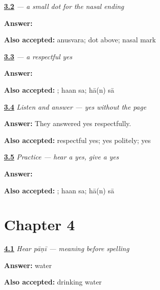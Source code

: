 \noindent\begin{minipage}[t]{\linewidth}
\raggedright
\hyperlink{review-MW-W03-anusvara-add}{\textbf{3.2}} \emph{ — a small dot for the nasal ending}\par
\small \textbf{Answer:} \par
\footnotesize \textbf{Also accepted:} anusvara; dot above; nasal mark
\end{minipage}\par\medskip

\noindent\begin{minipage}[t]{\linewidth}
\raggedright
\hyperlink{review-MW-C03-haan-saa-build}{\textbf{3.3}} \emph{  — a respectful yes}\par
\small \textbf{Answer:}  \par
\footnotesize \textbf{Also accepted:}  ; haan sa; hā(n) sā
\end{minipage}\par\medskip

\noindent\begin{minipage}[t]{\linewidth}
\raggedright
\hyperlink{review-MW-C03-listen-say-choice}{\textbf{3.4}} \emph{Listen and answer — yes without the page}\par
\small \textbf{Answer:} They answered yes respectfully.\par
\footnotesize \textbf{Also accepted:} respectful yes; yes politely; yes
\end{minipage}\par\medskip

\noindent\begin{minipage}[t]{\linewidth}
\raggedright
\hyperlink{review-MW-C03-practice-yes}{\textbf{3.5}} \emph{Practice — hear a yes, give a yes}\par
\small \textbf{Answer:}  \par
\footnotesize \textbf{Also accepted:}  ; haan sa; hā(n) sā
\end{minipage}\par\medskip

\section*{Chapter 4}

\noindent\begin{minipage}[t]{\linewidth}
\raggedright
\hyperlink{review-MW-C04-hear-paani-meaning}{\textbf{4.1}} \emph{Hear \emph{pāṇī} — meaning before spelling}\par
\small \textbf{Answer:} water\par
\footnotesize \textbf{Also accepted:} drinking water
\end{minipage}\par\medskip

